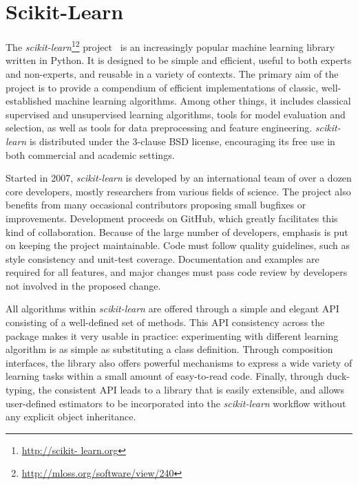 \documentclass{article}
\newcommand{\sklearn}{\textit{scikit-learn}\xspace}
\begin{document}

\section*{Scikit-Learn}

The \sklearn\footnote{\url{http://scikit-
learn.org}}\footnote{\url{http://mloss.org/software/view/240}}
project~\citep{pedregosa2011} is an increasingly popular machine learning
library written in Python.  It is designed to be simple and efficient, useful
to both experts and non-experts, and reusable in a variety of contexts. The
primary aim of the project is to provide a compendium of efficient
implementations of classic, well-established  machine learning algorithms.
Among other things, it includes classical supervised and unsupervised learning
algorithms, tools for model evaluation and selection, as well as tools for
data preprocessing and feature engineering. \sklearn is distributed under the
3-clause  BSD license, encouraging its free use in both commercial and academic
settings.

Started in 2007, \sklearn is developed by an international team of over a dozen
core developers, mostly researchers from various fields of science. The project
also benefits from many occasional contributors proposing small bugfixes or
improvements. Development proceeds on GitHub, which greatly facilitates this
kind of collaboration. Because of the large number of developers, emphasis is
put on keeping the project maintainable. Code must follow quality guidelines,
such as style consistency and unit-test coverage. Documentation and examples
are required for all features, and major changes must pass code review by
developers not involved in the proposed change.

All algorithms within \sklearn are offered through a simple and elegant
API~\citep{buitinck2013api} consisting of a well-defined set of methods.
This API consistency across the package makes it very usable in practice: experimenting
with different learning algorithm is as simple as substituting a class
definition. Through composition interfaces, the library also offers powerful
mechanisms to express a wide variety of learning tasks within a small amount of
easy-to-read code. Finally, through duck-typing, the consistent API leads to a
library that is easily extensible, and allows user-defined estimators to be
incorporated into the \sklearn workflow without any explicit object
inheritance.
\end{document}

